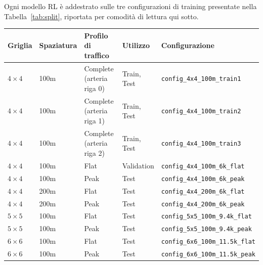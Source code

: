 Ogni modello RL è addestrato sulle tre configurazioni di training presentate nella Tabella~\ref{tab:split}, riportata
per comodità di lettura qui sotto.

\begin{table}[htbp]
  \centering
  \footnotesize
  \begin{tabular}{@{}lllll@{}}
    \toprule
    Griglia    & Spaziatura & Profilo di traffico       & Utilizzo    & Configurazione                          \\
    \midrule
    $4\times4$ & 100m       & Complete (arteria riga 0) & Train, Test & \texttt{config\_4x4\_100m\_train1}      \\
    $4\times4$ & 100m       & Complete (arteria riga 1) & Train, Test & \texttt{config\_4x4\_100m\_train2}      \\
    $4\times4$ & 100m       & Complete (arteria riga 2) & Train, Test & \texttt{config\_4x4\_100m\_train3}      \\
    $4\times4$ & 100m       & Flat                      & Validation  & \texttt{config\_4x4\_100m\_6k\_flat}    \\
    $4\times4$ & 100m       & Peak                      & Test        & \texttt{config\_4x4\_100m\_6k\_peak}    \\
    $4\times4$ & 200m       & Flat                      & Test        & \texttt{config\_4x4\_200m\_6k\_flat}    \\
    $4\times4$ & 200m       & Peak                      & Test        & \texttt{config\_4x4\_200m\_6k\_peak}    \\
    $5\times5$ & 100m       & Flat                      & Test        & \texttt{config\_5x5\_100m\_9.4k\_flat}  \\
    $5\times5$ & 100m       & Peak                      & Test        & \texttt{config\_5x5\_100m\_9.4k\_peak}  \\
    $6\times6$ & 100m       & Flat                      & Test        & \texttt{config\_6x6\_100m\_11.5k\_flat} \\
    $6\times6$ & 100m       & Peak                      & Test        & \texttt{config\_6x6\_100m\_11.5k\_peak} \\
    \bottomrule
  \end{tabular}
\end{table}

